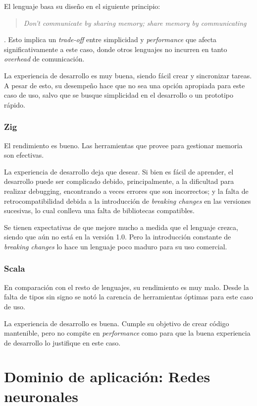 \documentclass[11pt]{article}
\let\Oldsection\section
\renewcommand{\section}{\FloatBarrier\Oldsection}
\let\Oldsubsubsection\subsubsection
\renewcommand{\subsubsection}{\FloatBarrier\Oldsubsubsection}
\newcommand{\english}[1]{\textit{#1}}
\begin{document}
El lenguaje basa su diseño en el siguiente principio: \blockquote[\cite{go:ex:effective_concurrency}]{\english{Don't communicate by sharing memory; share memory by communicating}} . Esto implica un \english{trade-off} entre simplicidad y \english{performance} que afecta significativamente a este caso, donde otros lenguajes no incurren en tanto \english{overhead} de comunicación.

La experiencia de desarrollo es muy buena, siendo fácil crear y sincronizar tareas. A pesar de esto, su desempeño hace que no sea una opción apropiada para este caso de uso, salvo que se busque simplicidad en el desarrollo o un prototipo rápido.

\subsubsection{Zig}

El rendimiento es bueno. Las herramientas que provee para gestionar memoria son efectivas.

La experiencia de desarrollo deja que desear. Si bien es fácil de aprender, el desarrollo puede ser complicado debido, principalmente, a la dificultad para realizar debugging, encontrando a veces errores que son incorrectos; y la falta de retrocompatibilidad debida a la introducción de \english{breaking changes} en las versiones sucesivas, lo cual conlleva una falta de bibliotecas compatibles. 

Se tienen expectativas de que mejore mucho a medida que el lenguaje crezca, siendo que aún no está en la versión 1.0. Pero la introducción constante de \english{breaking changes} lo hace un lenguaje poco maduro para su uso comercial.

\subsubsection{Scala}

En comparación con el resto de lenguajes, su rendimiento es muy malo. Desde la falta de tipos sin signo se notó la carencia de herramientas óptimas para este caso de uso.

La experiencia de desarrollo es buena. Cumple su objetivo de crear código mantenible, pero no compite en \english{performance} como para que la buena experiencia de desarrollo lo justifique en este caso.

\newpage

\section{Dominio de aplicación: Redes neuronales}
\end{document}
